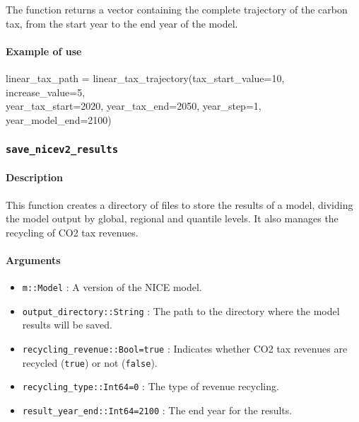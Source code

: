 \documentclass[
]{article}
\newenvironment{Shaded}{}{}
\newcommand{\FloatTok}[1]{\textcolor[rgb]{0.25,0.63,0.44}{#1}}
\newcommand{\FunctionTok}[1]{\textcolor[rgb]{0.02,0.16,0.49}{#1}}
\newcommand{\NormalTok}[1]{#1}
\newcommand{\OperatorTok}[1]{\textcolor[rgb]{0.40,0.40,0.40}{#1}}
\providecommand{\tightlist}{%
  \setlength{\itemsep}{0pt}\setlength{\parskip}{0pt}}
\begin{document}
The function returns a vector containing the complete trajectory of the
carbon tax, from the start year to the end year of the model.

\paragraph{Example of use}\label{example-of-use}

\small
\begin{Shaded}
\begin{Highlighting}[]
\NormalTok{linear\_tax\_path }\OperatorTok{=} \FunctionTok{linear\_tax\_trajectory}\NormalTok{(tax\_start\_value}\OperatorTok{=}\FloatTok{10}\NormalTok{, increase\_value}\OperatorTok{=}\FloatTok{5}\NormalTok{,} \\ 
\NormalTok{year\_tax\_start}\OperatorTok{=}\FloatTok{2020}\NormalTok{, year\_tax\_end}\OperatorTok{=}\FloatTok{2050}\NormalTok{, year\_step}\OperatorTok{=}\FloatTok{1}\NormalTok{, year\_model\_end}\OperatorTok{=}\FloatTok{2100}\NormalTok{)}
\end{Highlighting}
\end{Shaded}
\normalsize

\subsubsection{\texorpdfstring{\texttt{save\_nicev2\_results}}{Save\_nicev2\_results}}\label{save_nicev2_results}

\paragraph{Description}\label{description-2}

This function creates a directory of files to store the results of a
model, dividing the model output by global, regional and quantile
levels. It also manages the recycling of CO2 tax revenues.

\paragraph{Arguments}\label{arguments-1}

\begin{itemize}
\tightlist
\item
  \texttt{m::Model} : A version of the NICE model.
\item
\texttt{output\_directory::String} : The path to the directory where the model
  results will be saved.
\item
  \texttt{recycling\_revenue::Bool=true} : Indicates whether CO2 tax
  revenues are recycled (\texttt{true}) or not (\texttt{false}).
\item
  \texttt{recycling\_type::Int64=0} : The type of revenue recycling.
\item
  \texttt{result\_year\_end::Int64=2100} : The end year for the results.
\end{itemize}
\end{document}

